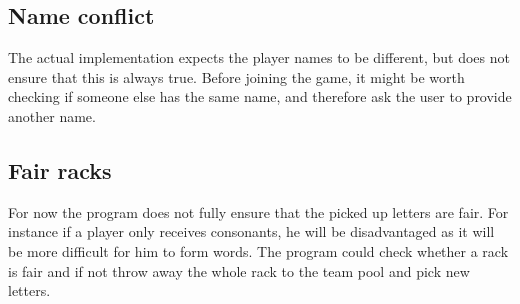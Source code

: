 \documentclass[a4paper,12pt]{article}
\begin{document}
\subsection{Name conflict}
The actual implementation expects the player names to be different, but does not ensure that this is always true. Before joining the game, it might be worth checking if someone else has the same name, and therefore ask the user to provide another name.

\subsection{Fair racks}
For now the program does not fully ensure that the picked up letters are fair. For instance if a player only receives consonants, he will be disadvantaged as it will be more difficult for him to form words. The program could check whether a rack is fair and if not throw away the whole rack to the team pool and pick new letters.
\end{document}
